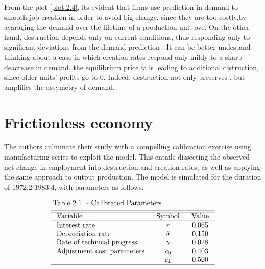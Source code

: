 \documentclass[12pt]{article}
\begin{document}
From the plot \ref{plot:2.4}, its evident that firms use prediction in demand to smooth job creation in order to avoid
big change, since they are too costly,by avaraging the demand over the lifetime of a production unit ove. On the other
hand, destruction depends only on current conditions, thus responding only to significant deviations from the demand
prediction . It can be better undestand thinking about a case in which creation rates respond only mildy to a sharp
deacrease in demand, the equilibrium price falls leading to additional distruction, since older units' profits go to 0.
Indeed, destruction not only preserves , but amplifies the assymetry of demand.\section{Frictionless economy}
\par
The authors culminate their study with a compelling calibration exercise using manufacturing series to exploit the
model. This entails dissecting the observed net change in employment into destruction and creation rates, as well as
applying the same approach to output production. The model is simulated for the duration of 1972:2-1983:4, with
parameters as follows: 

\begin{equation}
    \begin{aligned}
    &\text { Table 2.1 \label{Tab2.1} - Calibrated Parameters }\\
    &\begin{array}{lcc}
    \hline \hline \text { Variable } & \text { Symbol } & \text { Value } \\
    \hline \text { Interest rate } & r & 0.065 \\
    \text { Depreciation rate } & \delta & 0.150 \\
    \text { Rate of technical progress } & \gamma & 0.028 \\
    \text { Adjustment cost parameters } & c_0 & 0.403 \\
    & c_1 & 0.500 \\
    \hline
    \end{array}
    \end{aligned}
\end{equation}
\end{document}
